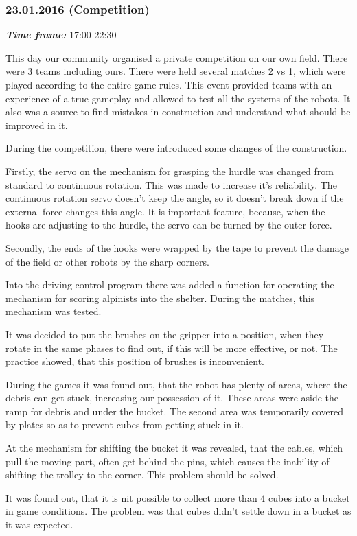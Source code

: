 \subsubsection{23.01.2016 (Competition)}
\textit{\textbf{Time frame:}} 17:00-22:30 

This day our community organised a private competition on our own field. There were 3 teams including ours. There were held several matches 2 vs 1, which were played according to the entire game rules. This event provided teams with an experience of a true gameplay and allowed to test all the systems of the robots. It also was a source to find mistakes in construction and understand what should be improved in it.

During the competition, there were introduced some changes of the construction.

Firstly, the servo on the mechanism for grasping the hurdle was changed from standard to continuous rotation. This was made to increase it's reliability. The continuous rotation servo doesn't keep the angle, so it doesn't break down if the external force changes this angle. It is important feature, because, when the hooks are adjusting to the hurdle, the servo can be turned by the outer force.

Secondly, the ends of the hooks were wrapped by the tape to prevent the damage of the field or other robots by the sharp corners.

Into the driving-control program there was added a function for operating the mechanism for scoring alpinists into the shelter. During the matches, this mechanism was tested.

It was decided to put the brushes on the gripper into a position, when they rotate in the same phases to find out, if this will be more effective, or not. The practice showed, that this position of brushes is inconvenient.

During the games it was found out, that the robot has plenty of areas, where the debris can get stuck, increasing our possession of it. These areas were aside the ramp for debris and under the bucket. The second area was temporarily covered by plates so as to prevent cubes from getting stuck in it.

At the mechanism for shifting the bucket it was revealed, that the cables, which pull the moving part, often get behind the pins, which causes the inability of shifting the trolley to the corner. This problem should be solved.

It was found out, that it is nit possible to collect more than 4 cubes into a bucket in game conditions. The problem was that cubes didn't settle down in a bucket as it was expected.
